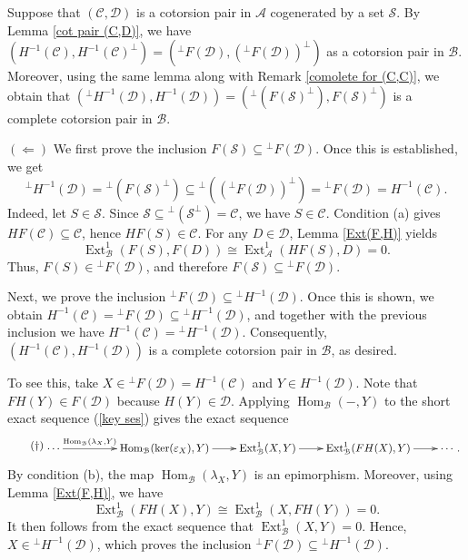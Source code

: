 \documentclass[12pt,twoside]{amsart}
\theoremstyle{bfupright head,slanted body}
\theoremstyle{bfupright head,upright body}
\theoremstyle{fixed bf head,slanted body}
\theoremstyle{fixed bf head,upright body}
\theoremstyle{numbered paragraph}
\newenvironment{prf*}[1][Proof]{%
  \begin{proof}[\bf #1]
    \setcounter{equation}{0}
    \renewcommand{\theequation}{\arabic{equation}}}
  {\end{proof}
}
\numberwithin{equation}{res}
\newcommand{\calC}{\mathcal{C}}
\newcommand{\calA}{\mathcal{A}}
\newcommand{\calB}{\mathcal{B}}
\newcommand{\calD}{\mathcal{D}}
\newcommand{\calS}{\mathcal{S}}
\newcommand{\Hom}{\operatorname{Hom}}
\newcommand{\Ext}{\operatorname{Ext}}
\begin{document}
\begin{prf*}
Suppose that \((\calC,\calD)\) is a cotorsion pair in \(\calA\) cogenerated by a set \(\calS\). By Lemma \ref{cot pair (C,D)}, we have
\(
(H^{-1}(\calC), H^{-1}(\calC)^\bot) = ({^\bot F(\calD)}, ({^\bot F(\calD)})^\bot)
\)
as a cotorsion pair in \(\calB\).
Moreover, using the same lemma along with Remark \ref{comolete for (C,C)}, we obtain that
\(
({^\bot H^{-1}(\calD)}, H^{-1}(\calD)) = ({^\bot(F(\calS)^\bot)}, F(\calS)^\bot)
\)
is a complete cotorsion pair in \(\calB\).

$(\Leftarrow)$
We first prove the inclusion \(F(\calS) \subseteq {^\bot F(\calD)}\).
Once this is established, we get
\[
{^\bot H^{-1}(\calD)} = {^\bot(F(\calS)^\bot)}
\subseteq {^\bot(({^\bot F(\calD)})^\bot)}
= {^\bot F(\calD)}
= H^{-1}(\calC).
\]
Indeed, let \(S\in\calS\). Since \(\calS\subseteq {^\bot(\calS^\bot)}=\calC\), we have \(S\in\calC\).
Condition (a) gives \(HF(\calC)\subseteq\calC\), hence \(HF(S)\in\calC\).
For any \(D\in\calD\), Lemma \ref{Ext(F,H)} yields
\[
\Ext_{\calB}^1(F(S),F(D)) \cong \Ext_{\calA}^1(HF(S),D)=0.
\]
Thus, \(F(S)\in {^\bot F(\calD)}\), and therefore \(F(\calS)\subseteq {^\bot F(\calD)}\).

Next, we prove the inclusion \({^\bot F(\calD)} \subseteq {^\bot H^{-1}(\calD)}\).
Once this is shown, we obtain
\(H^{-1}(\calC)={^\bot F(\calD)}\subseteq {^\bot H^{-1}(\calD)}\),
and together with the previous inclusion we have
\(H^{-1}(\calC)={^\bot H^{-1}(\calD)}\).
Consequently, \((H^{-1}(\calC),H^{-1}(\calD))\) is a complete cotorsion pair in \(\calB\), as desired.

To see this, take \(X\in {^\bot F(\calD)}=H^{-1}(\calC)\) and \(Y\in H^{-1}(\calD)\).
Note that \(FH(Y)\in F(\calD)\) because \(H(Y)\in\calD\).
Applying \(\Hom_\calB(-,Y)\) to the short exact sequence (\ref{key ses}) gives the exact sequence
\begin{equation*} \label{key ses 2} \tag{$\dagger$}
\begin{gathered}
\xymatrix@C=0.75cm{
   \cdots
\ar[rr]^-{\Hom_\calB(\lambda_X, Y)}
&& \Hom_\calB(\ker(\varepsilon_X), Y)
\ar[r]
& \Ext_\calB^1(X, Y)
\ar[r]
& \Ext_\calB^1(FH(X), Y)
\ar[r]
& \cdots.}
\end{gathered}
\end{equation*}
By condition (b), the map \(\Hom_\calB(\lambda_X,Y)\) is an epimorphism.
Moreover, using Lemma \ref{Ext(F,H)}, we have
\[
\Ext_\calB^1(FH(X),Y) \cong \Ext_\calB^1(X,FH(Y))=0.
\]
It then follows from the exact sequence that \(\Ext_\calB^1(X,Y)=0\).
Hence, \(X\in {^\bot H^{-1}(\calD)}\), which proves the inclusion \({^\bot F(\calD)}\subseteq {^\bot H^{-1}(\calD)}\).


\end{prf*}
\end{document}
